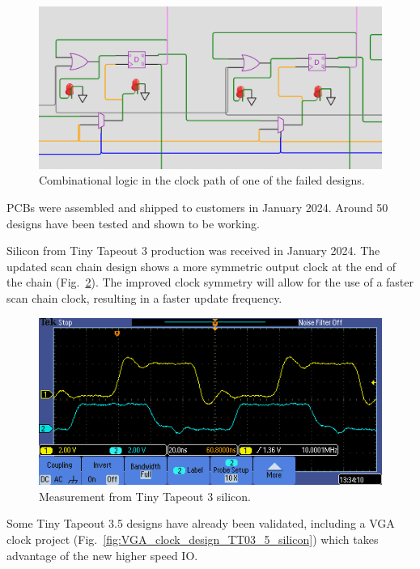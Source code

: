 \begin{figure}[!t]
\centering
\includegraphics[width=\columnwidth]{./Figs/wokwi mux clock logic.png}
\caption{Combinational logic in the clock path of one of the failed designs.}
\label{fig:failed_design_comb_logic}
\end{figure}

PCBs were assembled and shipped to customers in January 2024. Around 50 designs have been tested and shown to be working.

Silicon from Tiny Tapeout 3 production was received in January 2024. The updated scan chain design shows a more symmetric output clock at the end of the chain (Fig.~\ref{fig:TT03_silicon_measurement}). The improved clock symmetry will allow for the use of a faster scan chain clock, resulting in a faster update frequency.

\begin{figure}[!t]
\centering
\includegraphics[width=\columnwidth]{./Figs/tt03_clock_out.png}
\caption{Measurement from Tiny Tapeout 3 silicon.}
\label{fig:TT03_silicon_measurement}
\end{figure}

Some Tiny Tapeout 3.5 designs have already been validated, including a VGA clock project (Fig.~\ref{fig:VGA_clock_design_TT03_5_silicon}) which takes advantage of the new higher speed IO.

